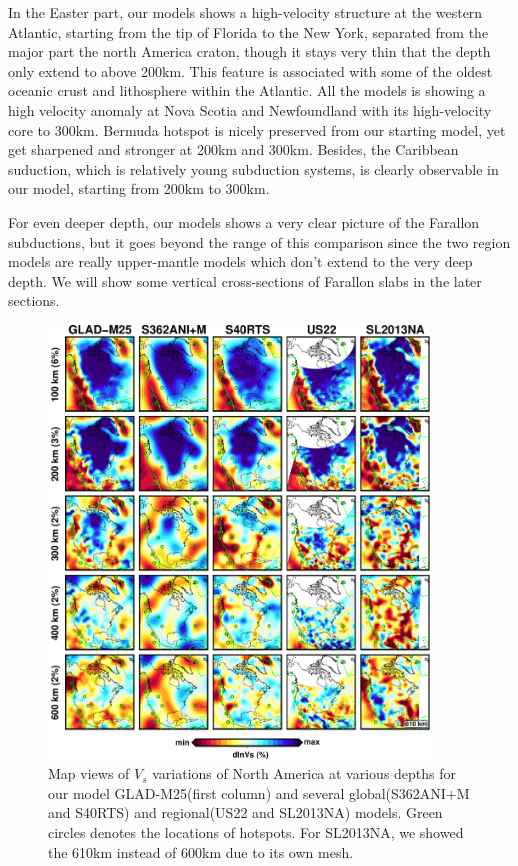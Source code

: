 \documentclass[extra,mreferee]{gji}
\begin{document}
In the Easter part, our models shows a high-velocity structure at the western
Atlantic, starting from the tip of Florida to the New York,
separated from the major part the north America craton,
though it stays very thin that the depth only extend to above 200km.
This feature is associated with some of the oldest oceanic crust and lithosphere
within the Atlantic\citep{muller2008, schaeffer2014imaging}.
All the models is showing a high velocity anomaly at Nova Scotia and Newfoundland
with its high-velocity core to 300km.
Bermuda hotspot is nicely preserved from our starting
model, yet get sharpened and stronger at 200km and 300km. Besides, the
Caribbean suduction, which is relatively young subduction systems, is clearly
observable in our model, starting from 200km to 300km.

For even deeper depth, our models shows a very clear picture of the Farallon
subductions, but it goes beyond the range of this comparison since the two
region models are really upper-mantle models which don't extend to the very
deep depth. We will show some vertical cross-sections of Farallon slabs in
the later sections.

\begin{figure}
\centering
\includegraphics[width=0.9\textwidth]{figures/depth_slice/america_vs.pdf}
  \caption{Map views of $V_s$ variations of North America at various depths
  for our model GLAD-M25(first column) and several global(S362ANI$+$M and S40RTS)
  and regional(US22\citep{zhu2017radial} and SL2013NA\citep{schaeffer2014imaging})
  models. Green circles denotes the locations of hotspots. For SL2013NA, we
  showed the 610km instead of 600km due to its own mesh.}
\label{fig:america-vs}

\end{figure}
\end{document}
